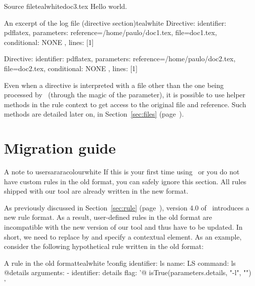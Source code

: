 \begin{ncodebox}{Source file}{teal}{\icnote}{white}{doc3.tex}
Hello world.
\bye
\end{ncodebox}

\begin{codebox}{An excerpt of the log file (directive section)}{teal}{\icnote}{white}
Directive: { identifier: pdflatex, parameters:
{reference=/home/paulo/doc1.tex, file=doc1.tex},
conditional: { NONE }, lines: [1] }

Directive: { identifier: pdflatex, parameters:
{reference=/home/paulo/doc2.tex, file=doc2.tex},
conditional: { NONE }, lines: [1] }
\end{codebox}

Even when a directive is interpreted with a file other than the one being processed by \arara\ (through the magic of the  parameter), it is possible to use helper methods in the rule context to get access to the original file and reference. Such methods are detailed later on, in Section~\ref{sec:files} (page~\pageref{sec:files}).

\section{Migration guide}
\label{sec:migrationguide}

\begin{messagebox}{A note to users}{araracolour}{\icattention}{white}
If this is your first time using \arara\ or you do not have custom rules in the old format, you can safely ignore this section. All rules shipped with our tool are already written in the new format.
\end{messagebox}

As previously discussed in Section~\ref{sec:rule} (page~\pageref{sec:rule}), version 4.0 of \arara\ introduces a new rule format. As a result, user-defined rules in the old format are incompatible with the new version of our tool and thus have to be updated. In short, we need to replace  by  and specify a contextual element. As an example, consider the following hypothetical rule  written in the old format:

\begin{codebox}{A rule in the old format}{teal}{\icnote}{white}
!config
identifier: ls
name: LS
command: ls @{details}
arguments:
- identifier: details
  flag: '@{ isTrue(parameters.details, "-l", "") }'
\end{codebox}

